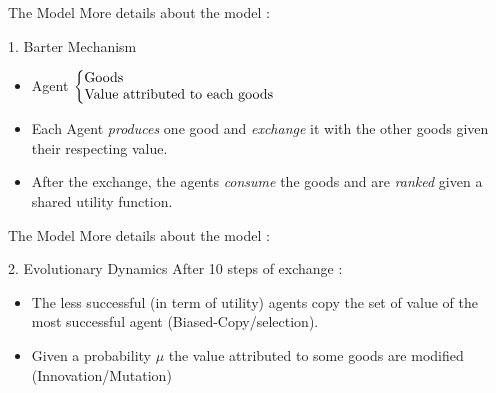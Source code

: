 \documentclass[8pt, handout=show,notes=show]{beamer}
\begin{document}
	
\begin{frame}{The Model}
    More details about the model : 
    \vfill
	\begin{block}{1. Barter Mechanism}
	    \begin{itemize}
		\item Agent 
		    $\left\{
			\begin{tabular}{@{}l@{}}
			    Goods \\
			    Value attributed to each goods\\
			\end{tabular}
			\right.$
		    \item Each Agent \emph{produces} one good and \emph{exchange} it with the other goods given their respecting value.
		    \item After the exchange, the agents \emph{consume} the goods and are \emph{ranked} given a shared utility function.
		\end{itemize}

	\end{block}
\end{frame}

\begin{frame}{The Model}
    More details about the model : 
    \vfill
	\begin{block}{2. Evolutionary Dynamics}
		After 10 steps of exchange :
		\begin{itemize}
			\item  The less successful (in term of utility) agents copy the set of value of the most successful agent (Biased-Copy/selection).
			\item Given a probability $\mu$ the value attributed to some goods are modified (Innovation/Mutation)
		\end{itemize}

	\end{block}
\end{frame}

\end{document}
